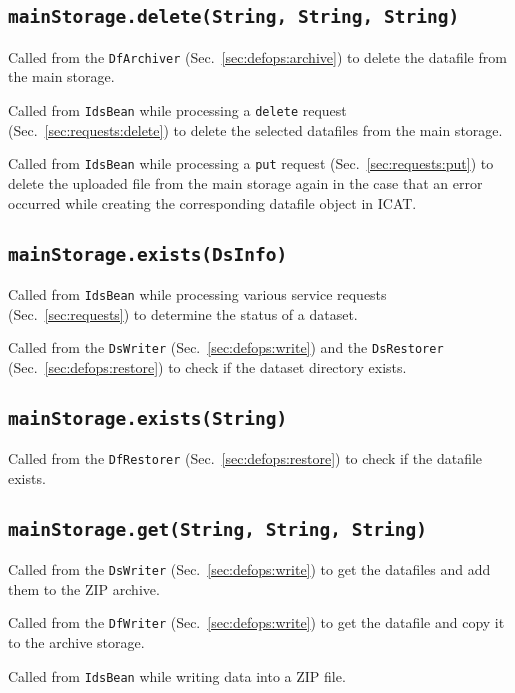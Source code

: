 \documentclass[paper=a4]{scrartcl}
\begin{document}
\subsection{\texttt{mainStorage.delete(String, String, String)}}

Called from the \texttt{DfArchiver} (Sec.~\ref{sec:defops:archive})
to delete the datafile from the main storage.

Called from \texttt{IdsBean} while processing a \texttt{delete}
request (Sec.~\ref{sec:requests:delete}) to delete the selected
datafiles from the main storage.

Called from \texttt{IdsBean} while processing a \texttt{put} request
(Sec.~\ref{sec:requests:put}) to delete the uploaded file from the
main storage again in the case that an error occurred while creating
the corresponding datafile object in ICAT.

\subsection{\texttt{mainStorage.exists(DsInfo)}}

Called from \texttt{IdsBean} while processing various service requests
(Sec.~\ref{sec:requests}) to determine the status of a dataset.

Called from the \texttt{DsWriter} (Sec.~\ref{sec:defops:write}) and
the \texttt{DsRestorer} (Sec.~\ref{sec:defops:restore}) to check if
the dataset directory exists.

\subsection{\texttt{mainStorage.exists(String)}}

Called from the \texttt{DfRestorer} (Sec.~\ref{sec:defops:restore})
to check if the datafile exists.

\subsection{\texttt{mainStorage.get(String, String, String)}}

Called from the \texttt{DsWriter} (Sec.~\ref{sec:defops:write}) to
get the datafiles and add them to the ZIP archive.

Called from the \texttt{DfWriter} (Sec.~\ref{sec:defops:write}) to
get the datafile and copy it to the archive storage.

Called from \texttt{IdsBean} while writing data into a ZIP file.
\end{document}

